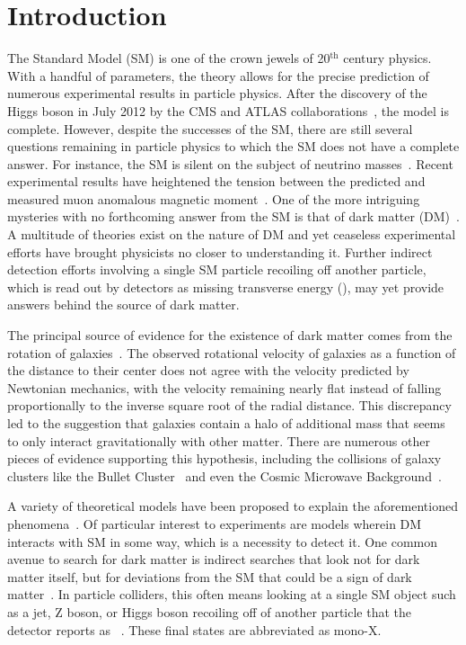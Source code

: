 \chapter{Introduction}
\label{chap:intro}
The Standard Model (SM) is one of the crown jewels of 20$^{\text{th}}$ century physics. With a handful of parameters, the theory allows for the precise prediction of numerous experimental results in particle physics. After the discovery of the Higgs boson in July 2012 by the CMS and ATLAS collaborations~\cite{atlas2012, cms2012}, the model is complete. However, despite the successes of the SM, there are still several questions remaining in particle physics to which the SM does not have a complete answer. For instance, the SM is silent on the subject of neutrino masses~\cite{Capozzi_2016}. Recent experimental results have heightened the tension between the predicted and measured muon anomalous magnetic moment~\cite{PhysRevLett.126.141801}. One of the more intriguing mysteries with no forthcoming answer from the SM is that of dark matter (DM)~\cite{Planck:2020cp,Zwicky_1933}. A multitude of theories exist on the nature of DM and yet ceaseless experimental efforts have brought physicists no closer to understanding it. Further indirect detection efforts involving a single SM particle recoiling off another particle, which is read out by detectors as missing transverse energy (\ptmiss), may yet provide answers behind the source of dark matter.

The principal source of evidence for the existence of dark matter comes from the rotation of galaxies~\cite{Rubin_1970}. The observed rotational velocity of galaxies as a function of the distance to their center does not agree with the velocity predicted by Newtonian mechanics, with the velocity remaining nearly flat instead of falling proportionally to the inverse square root of the radial distance. This discrepancy led to the suggestion that galaxies contain a halo of additional mass that seems to only interact gravitationally with other matter. There are numerous other pieces of evidence supporting this hypothesis, including the collisions of galaxy clusters like the Bullet Cluster~\cite{Thompson_2015} and even the Cosmic Microwave Background~\cite{Planck:2020cp}.

A variety of theoretical models have been proposed to explain the aforementioned phenomena~\cite{dm2005,Arcadi_2018}. Of particular interest to experiments are models wherein DM interacts with SM in some way, which is a necessity to detect it. One common avenue to search for dark matter is indirect searches that look not for dark matter itself, but for deviations from the SM that could be a sign of dark matter~\cite{Gaskins_2016}. In particle colliders, this often means looking at a single SM object such as a jet, Z boson, or Higgs boson recoiling off of another particle that the detector reports as \ptmiss~\cite{dms2018}. These final states are abbreviated as mono-X.

